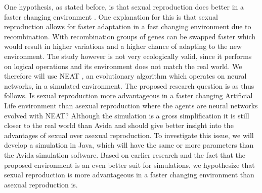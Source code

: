 One hypothesis, as stated before, is that sexual reproduction does better in a faster changing environment \cite{misevicchanging}. 
One explanation for this is that sexual reproduction allows for faster adaptation in a fast changing environment due to recombination. 
With recombination groups of genes can be swapped faster which would result in higher variations and a higher chance of adapting to the new environment.
The study however is not very ecologically valid, since it performs on logical operations and its environment does not match the real world. 
We therefore will use NEAT \cite{stanleyneat}, an evolutionary algorithm which operates on neural networks, in a simulated environment. 
The proposed research question is as thus follows.
Is sexual reproduction more advantageous in a faster changing Artificial Life environment than asexual reproduction where the agents are neural networks evolved with NEAT? 
Although the simulation is a gross simplification it is still closer to the real world than Avida and should give better insight into the advantages of sexual over asexual reproduction.
To investigate this issue, we will develop a simulation in Java, which will have the same or more parameters than the Avida simulation software.
Based on earlier research and the fact that the proposed environment is an even better suit for simulations, we hypothesize that sexual reproduction is more advantageous in a faster changing environment than asexual reproduction is.
